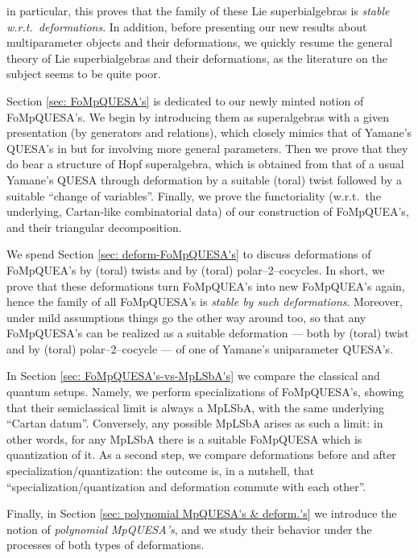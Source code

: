 \documentclass[12pt,reqno,twoside,a4paper]{amsart}
\numberwithin{equation}{section}
\theoremstyle{definition}
\newtheorem{free text}[lema]{}
\theoremstyle{remark}
\theoremstyle{plain}
\begin{document}
in particular, this proves that the family of these Lie superbialgebras is  \textsl{stable w.r.t.\ deformations}. In addition, before presenting our new results about multiparameter objects and their deformations, we quickly resume the general theory of Lie superbialgebras and their deformations, as the literature on the subject seems to be quite poor.
                                                                  \par
   Section \ref{sec: FoMpQUESA's}  is dedicated to our newly minted notion of FoMpQUESA's.  We begin by introducing them as superalgebras with a given presentation (by generators and relations), which closely mimics that of Yamane's QUESA's in  \cite{Ya1}  but for involving more general parameters.  Then we prove that they do bear a structure of Hopf superalgebra, which is obtained from that of a usual Yamane's QUESA through deformation by a suitable (toral) twist followed by a suitable ``change of variables''.  Finally, we prove the functoriality (w.r.t.\ the underlying, Cartan-like combinatorial data) of our construction of FoMpQUEA's, and their triangular decomposition.
                                                                  \par
   We spend Section  \ref{sec: deform-FoMpQUESA's}  to discuss deformations of FoMpQUEA's by (toral) twists and by (toral) polar--2--cocycles.  In short, we prove that these deformations turn FoMpQUEA's into new FoMpQUEA's again, hence the family of all FoMpQUESA's is  \textsl{stable by such deformations}.  Moreover, under mild assumptions things go the other way around too, so that any FoMpQUESA's can be realized as a suitable deformation --- both by (toral) twist and by (toral) polar--2--cocycle ---   of one of Yamane's uniparameter QUESA's.
                                                                  \par
   In Section  \ref{sec: FoMpQUESA's-vs-MpLSbA's}  we compare the classical and quantum setups.  Namely, we perform specializations of FoMpQUESA's, showing that their semiclassical limit is always a MpLSbA, with the same underlying ``Cartan datum''.  Conversely, any possible MpLSbA arises as such a limit: in other words, for any MpLSbA there is a suitable FoMpQUESA which is quantization of it.  As a second step, we compare deformations before and after specialization/quantization: the outcome is, in a nutshell, that ``specialization/quantization and deformation commute with each other''.
                                                                  \par
   Finally, in Section \ref{sec: polynomial MpQUESA's & deform.'s}  we introduce the notion of  \textit{polynomial MpQUESA's},  and we study their behavior under the processes of both types of deformations.
\end{document}
